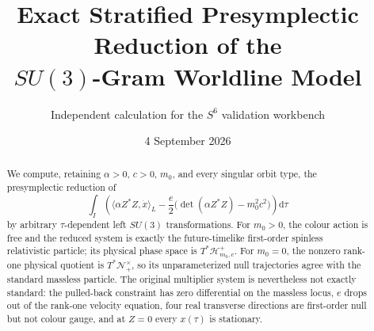 \documentclass[11pt]{article}
\title{Exact Stratified Presymplectic Reduction of the\\
\(SU(3)\)-Gram Worldline Model}
\author{Independent calculation for the \(S^6\) validation workbench}
\date{4 September 2026}
\newcommand{\dd}{\mathrm d}
\begin{document}
\linenumbers
\maketitle
\begin{abstract}
We compute, retaining \(\alpha>0\), \(c>0\), \(m_0\), and every singular
orbit type, the presymplectic reduction of
\[
 \int_I\left(\langle\alpha Z^*Z,\dot x\rangle_L
 -\frac e2\bigl(\det(\alpha Z^*Z)-m_0^2c^2\bigr)\right)\dd\tau
\]
by arbitrary \(\tau\)-dependent left \(SU(3)\) transformations.
For \(m_0>0\), the colour action is free and the reduced system is
exactly the future-timelike first-order spinless relativistic particle;
its physical phase space is \(T^*\mathcal H^+_{m_0,c}\).
For \(m_0=0\), the nonzero rank-one physical quotient is
\(T^*\mathcal N_+^\times\), so its unparameterized null trajectories
agree with the standard massless particle.  The original multiplier
system is nevertheless not exactly standard: the pulled-back
constraint has zero differential on the massless locus, \(e\) drops
out of the rank-one velocity equation, four real transverse directions
are first-order null but not colour gauge, and at \(Z=0\) every
\(x(\tau)\) is stationary.
\end{abstract}
\tableofcontents
\end{document}
